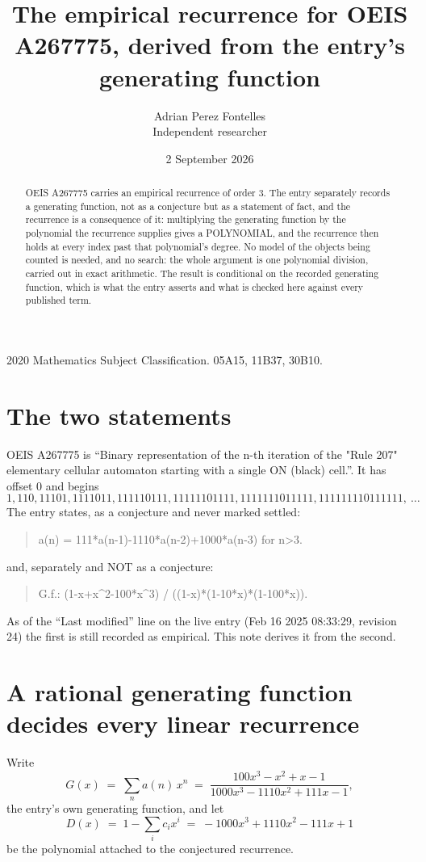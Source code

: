 \documentclass[11pt,a4paper]{article}
\title{The empirical recurrence for OEIS A267775, derived from the entry's generating function}
\author{Adrian Perez Fontelles\\ \small Independent researcher}
\date{2 September 2026}
\theoremstyle{plain}
\theoremstyle{definition}
\begin{document}
\maketitle

\begin{abstract}
OEIS A267775 carries an empirical recurrence of order $3$. The entry separately records a
generating function, not as a conjecture but as a statement of fact, and the recurrence is a
consequence of it: multiplying the generating function by the polynomial the recurrence
supplies gives a POLYNOMIAL, and the recurrence then holds at every index past that
polynomial's degree. No model of the objects being counted is needed, and no search: the
whole argument is one polynomial division, carried out in exact arithmetic. The result is
conditional on the recorded generating function, which is what the entry asserts and what is
checked here against every published term.
\end{abstract}

\noindent\small 2020 Mathematics Subject Classification. 05A15, 11B37, 30B10.\normalsize

\section{The two statements}

OEIS A267775 is ``Binary representation of the n-th iteration of the "Rule 207" elementary cellular automaton starting with a single ON (black) cell.''. It has offset $0$ and begins
\[
1, 110, 11101, 1111011, 111110111, 11111101111, 1111111011111, 111111110111111,\ \dots
\]
The entry states, as a conjecture and never marked settled:
\begin{quote}
a(n) = 111*a(n-1)-1110*a(n-2)+1000*a(n-3) for n>3.
\end{quote}
and, separately and NOT as a conjecture:
\begin{quote}
G.f.: (1-x+x\^{}2-100*x\^{}3) / ((1-x)*(1-10*x)*(1-100*x)).
\end{quote}
As of the ``Last modified'' line on the live entry (Feb 16 2025 08:33:29, revision 24) the first is still
recorded as empirical. This note derives it from the second.

\section{A rational generating function decides every linear recurrence}

Write
\[
G(x)\;=\;\sum_{n}a(n)\,x^{n}\;=\;\frac{100 x^{3} - x^{2} + x - 1}{1000 x^{3} - 1110 x^{2} + 111 x - 1},
\]
the entry's own generating function, and let
\[
D(x)\;=\;1-\sum_i c_i x^{i}\;=\;- 1000 x^{3} + 1110 x^{2} - 111 x + 1
\]
be the polynomial attached to the conjectured recurrence.
\end{document}
